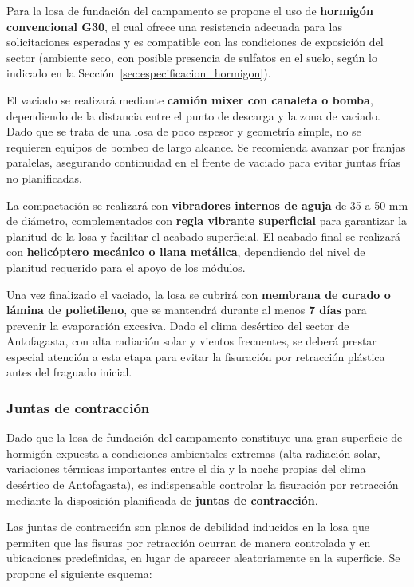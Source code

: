 Para la losa de fundación del campamento se propone el uso de \textbf{hormigón convencional G30}, el cual ofrece una resistencia adecuada para las solicitaciones esperadas y es compatible con las condiciones de exposición del sector (ambiente seco, con posible presencia de sulfatos en el suelo, según lo indicado en la Sección~\ref{sec:especificacion_hormigon}).

El vaciado se realizará mediante \textbf{camión mixer con canaleta o bomba}, dependiendo de la distancia entre el punto de descarga y la zona de vaciado. Dado que se trata de una losa de poco espesor y geometría simple, no se requieren equipos de bombeo de largo alcance. Se recomienda avanzar por franjas paralelas, asegurando continuidad en el frente de vaciado para evitar juntas frías no planificadas.

La compactación se realizará con \textbf{vibradores internos de aguja} de 35 a 50 mm de diámetro, complementados con \textbf{regla vibrante superficial} para garantizar la planitud de la losa y facilitar el acabado superficial. El acabado final se realizará con \textbf{helicóptero mecánico o llana metálica}, dependiendo del nivel de planitud requerido para el apoyo de los módulos.

Una vez finalizado el vaciado, la losa se cubrirá con \textbf{membrana de curado o lámina de polietileno}, que se mantendrá durante al menos \textbf{7 días} para prevenir la evaporación excesiva. Dado el clima desértico del sector de Antofagasta, con alta radiación solar y vientos frecuentes, se deberá prestar especial atención a esta etapa para evitar la fisuración por retracción plástica antes del fraguado inicial.

\subsubsection{Juntas de contracción}

Dado que la losa de fundación del campamento constituye una gran superficie de hormigón expuesta a condiciones ambientales extremas (alta radiación solar, variaciones térmicas importantes entre el día y la noche propias del clima desértico de Antofagasta), es indispensable controlar la fisuración por retracción mediante la disposición planificada de \textbf{juntas de contracción}.

Las juntas de contracción son planos de debilidad inducidos en la losa que permiten que las fisuras por retracción ocurran de manera controlada y en ubicaciones predefinidas, en lugar de aparecer aleatoriamente en la superficie. Se propone el siguiente esquema:


